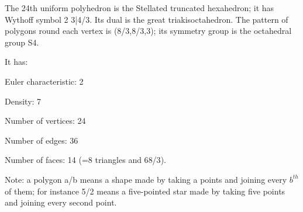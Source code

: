 The 24th uniform polyhedron is the Stellated truncated hexahedron; it has Wythoff symbol 2 3|4/3. Its dual is the great triakisoctahedron. The pattern of polygons round each vertex is (8/3,8/3,3); its symmetry group is the octahedral group S4.\par
It has:\par
Euler characteristic: 2\par
Density: 7\par
Number of vertices: 24\par
Number of edges:  36\par
Number of faces: 14 (=8 triangles and 6{8/3}).\par
Note: a polygon a/b means a shape made by taking a points and joining every $b^{th}$  of them; for instance 5/2 means a five-pointed star made by taking five points and joining every second point.